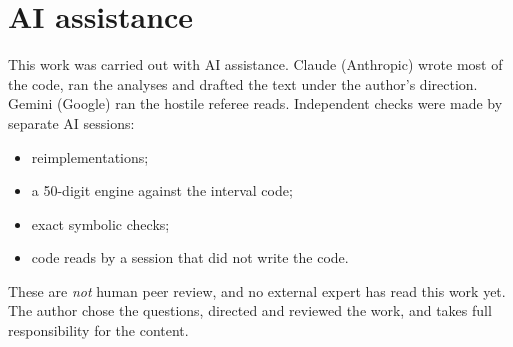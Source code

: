 \documentclass[11pt,a4paper]{article}
\begin{document}
\section{AI assistance}
This work was carried out with AI assistance. Claude (Anthropic) wrote most of the code, ran the analyses and
drafted the text under the author's direction. Gemini (Google) ran the hostile referee reads. Independent checks
were made by separate AI sessions:
\begin{itemize}
\item reimplementations;
\item a 50-digit engine against the interval code;
\item exact symbolic checks;
\item code reads by a session that did not write the code.
\end{itemize}
These are \emph{not} human peer review, and no external expert has read this work yet. The author chose the
questions, directed and reviewed the work, and takes full responsibility for the content.
\end{document}
